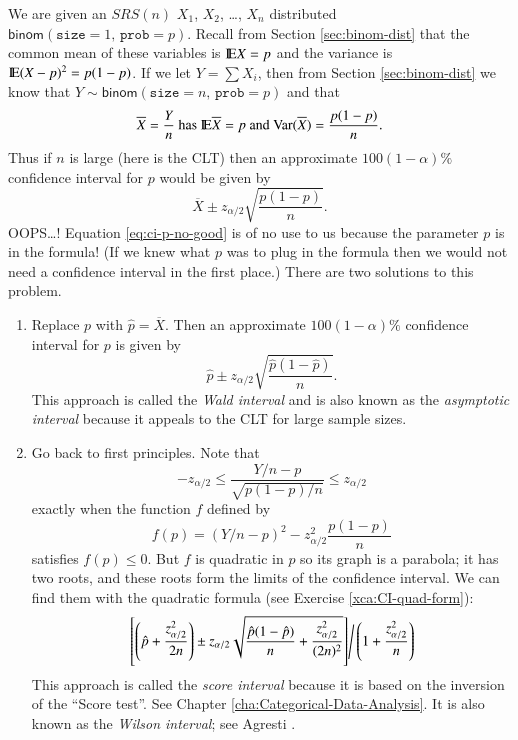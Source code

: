 \documentclass[captions=tableheading]{scrbook}
\begin{document}
We are given an \(SRS(n)\) \(X_{1}\), \(X_{2}\), \ldots{}, \(X_{n}\) distributed \(\mathsf{binom}(\mathtt{size}=1,\,\mathtt{prob}=p)\). Recall from Section \ref{sec:binom-dist} that the common mean of these variables is \(\mathrm{I\hspace{-1.5pt}E} X=p\) and the variance is \(\mathrm{I\hspace{-1.5pt}E}(X-p)^{2}=p(1-p)\). If we let \(Y=\sum X_{i}\), then from Section \ref{sec:binom-dist} we know that \(Y\sim\mathsf{binom}(\mathtt{size}=n,\,\mathtt{prob}=p)\) and that 
\[
\overline{X}=\frac{Y}{n}\mbox{ has }\mathrm{I\hspace{-1.5pt}E}\overline{X}=p\mbox{ and }\mathrm{Var}(\overline{X})=\frac{p(1-p)}{n}.
\]
Thus if \(n\) is large (here is the CLT) then an approximate \(100(1-\alpha)\%\) confidence interval for \(p\) would be given by
\begin{equation}
\overline{X}\pm z_{\alpha/2}\sqrt{\frac{p(1-p)}{n}}.\label{eq:ci-p-no-good}
\end{equation}
OOPS\ldots{}! Equation \ref{eq:ci-p-no-good} is of no use to us because the  parameter \(p\) is in the formula! (If we knew what \(p\) was to plug in the formula then we would not need a confidence interval in the first place.) There are two solutions to this problem.
\begin{enumerate}
\item Replace \(p\) with \(\hat{p}=\overline{X}\). Then an approximate \(100(1-\alpha)\%\) confidence interval for \(p\) is given by 
   \begin{equation}
   \hat{p}\pm z_{\alpha/2}\sqrt{\frac{\hat{p}(1-\hat{p})}{n}}.
   \end{equation}
   This approach is called the \emph{Wald interval} and is also known as the \emph{asymptotic interval} because it appeals to the CLT for large sample sizes.
\item Go back to first principles. Note that
   \[
   -z_{\alpha/2}\leq\frac{Y/n-p}{\sqrt{p(1-p)/n}}\leq z_{\alpha/2}
   \]
   exactly when the function \(f\) defined by
   \[
   f(p)=\left(Y/n-p\right)^{2}-z_{\alpha/2}^{2}\frac{p(1-p)}{n}
   \]
   satisfies \(f(p)\leq0\). But \(f\) is quadratic in \(p\) so its graph is a parabola; it has two roots, and these roots form the limits of the confidence interval. We can find them with the quadratic formula (see Exercise \ref{xca:CI-quad-form}):
   \begin{equation}
   \left.\left[\left(\hat{p}+\frac{z_{\alpha/2}^{2}}{2n}\right)\pm z_{\alpha/2}\sqrt{\frac{\hat{p}(1-\hat{p})}{n}+\frac{z_{\alpha/2}^{2}}{(2n)^{2}}}\right]\right\slash \left(1+\frac{z_{\alpha/2}^{2}}{n}\right)
   \end{equation}
   This approach is called the \emph{score interval} because it is based on the inversion of the ``Score test''. See Chapter \ref{cha:Categorical-Data-Analysis}. It is also known as the \emph{Wilson interval}; see Agresti \cite{Agresti2002}.
\end{enumerate}
\end{document}
